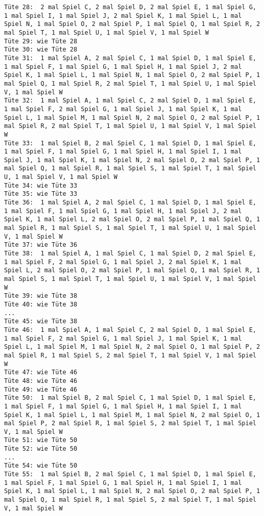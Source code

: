 \documentclass[a4paper,10pt,ngerman]{scrartcl}
\begin{document}
\begin{lstlisting}[frame=tb,breaklines=true]
Tüte 28:  2 mal Spiel C, 2 mal Spiel D, 2 mal Spiel E, 1 mal Spiel G, 1 mal Spiel I, 1 mal Spiel J, 2 mal Spiel K, 1 mal Spiel L, 1 mal Spiel N, 1 mal Spiel O, 2 mal Spiel P, 1 mal Spiel Q, 1 mal Spiel R, 2 mal Spiel T, 1 mal Spiel U, 1 mal Spiel V, 1 mal Spiel W
Tüte 29: wie Tüte 28
Tüte 30: wie Tüte 28
Tüte 31:  1 mal Spiel A, 2 mal Spiel C, 1 mal Spiel D, 1 mal Spiel E, 1 mal Spiel F, 1 mal Spiel G, 1 mal Spiel H, 1 mal Spiel J, 2 mal Spiel K, 1 mal Spiel L, 1 mal Spiel N, 1 mal Spiel O, 2 mal Spiel P, 1 mal Spiel Q, 1 mal Spiel R, 2 mal Spiel T, 1 mal Spiel U, 1 mal Spiel V, 1 mal Spiel W
Tüte 32:  1 mal Spiel A, 1 mal Spiel C, 2 mal Spiel D, 1 mal Spiel E, 1 mal Spiel F, 2 mal Spiel G, 1 mal Spiel J, 1 mal Spiel K, 1 mal Spiel L, 1 mal Spiel M, 1 mal Spiel N, 2 mal Spiel O, 2 mal Spiel P, 1 mal Spiel R, 2 mal Spiel T, 1 mal Spiel U, 1 mal Spiel V, 1 mal Spiel W
Tüte 33:  1 mal Spiel B, 2 mal Spiel C, 1 mal Spiel D, 1 mal Spiel E, 1 mal Spiel F, 1 mal Spiel G, 1 mal Spiel H, 1 mal Spiel I, 1 mal Spiel J, 1 mal Spiel K, 1 mal Spiel N, 2 mal Spiel O, 2 mal Spiel P, 1 mal Spiel Q, 1 mal Spiel R, 1 mal Spiel S, 1 mal Spiel T, 1 mal Spiel U, 1 mal Spiel V, 1 mal Spiel W
Tüte 34: wie Tüte 33
Tüte 35: wie Tüte 33
Tüte 36:  1 mal Spiel A, 2 mal Spiel C, 1 mal Spiel D, 1 mal Spiel E, 1 mal Spiel F, 1 mal Spiel G, 1 mal Spiel H, 1 mal Spiel J, 2 mal Spiel K, 1 mal Spiel L, 2 mal Spiel O, 2 mal Spiel P, 1 mal Spiel Q, 1 mal Spiel R, 1 mal Spiel S, 1 mal Spiel T, 1 mal Spiel U, 1 mal Spiel V, 1 mal Spiel W
Tüte 37: wie Tüte 36
Tüte 38:  1 mal Spiel A, 1 mal Spiel C, 1 mal Spiel D, 2 mal Spiel E, 1 mal Spiel F, 2 mal Spiel G, 1 mal Spiel J, 2 mal Spiel K, 1 mal Spiel L, 2 mal Spiel O, 2 mal Spiel P, 1 mal Spiel Q, 1 mal Spiel R, 1 mal Spiel S, 1 mal Spiel T, 1 mal Spiel U, 1 mal Spiel V, 1 mal Spiel W
Tüte 39: wie Tüte 38
Tüte 40: wie Tüte 38
...
Tüte 45: wie Tüte 38
Tüte 46:  1 mal Spiel A, 1 mal Spiel C, 2 mal Spiel D, 1 mal Spiel E, 1 mal Spiel F, 2 mal Spiel G, 1 mal Spiel J, 1 mal Spiel K, 1 mal Spiel L, 1 mal Spiel M, 1 mal Spiel N, 2 mal Spiel O, 1 mal Spiel P, 2 mal Spiel R, 1 mal Spiel S, 2 mal Spiel T, 1 mal Spiel V, 1 mal Spiel W
Tüte 47: wie Tüte 46
Tüte 48: wie Tüte 46
Tüte 49: wie Tüte 46
Tüte 50:  1 mal Spiel B, 2 mal Spiel C, 1 mal Spiel D, 1 mal Spiel E, 1 mal Spiel F, 1 mal Spiel G, 1 mal Spiel H, 1 mal Spiel I, 1 mal Spiel K, 1 mal Spiel L, 1 mal Spiel M, 1 mal Spiel N, 2 mal Spiel O, 1 mal Spiel P, 2 mal Spiel R, 1 mal Spiel S, 2 mal Spiel T, 1 mal Spiel V, 1 mal Spiel W
Tüte 51: wie Tüte 50
Tüte 52: wie Tüte 50
...
Tüte 54: wie Tüte 50
Tüte 55:  1 mal Spiel B, 2 mal Spiel C, 1 mal Spiel D, 1 mal Spiel E, 1 mal Spiel F, 1 mal Spiel G, 1 mal Spiel H, 1 mal Spiel I, 1 mal Spiel K, 1 mal Spiel L, 1 mal Spiel N, 2 mal Spiel O, 2 mal Spiel P, 1 mal Spiel Q, 1 mal Spiel R, 1 mal Spiel S, 2 mal Spiel T, 1 mal Spiel V, 1 mal Spiel W

\end{lstlisting}
\end{document}
